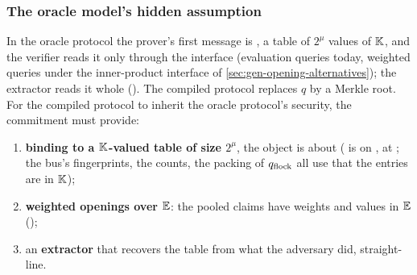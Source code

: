 \subsubsection{The oracle model's hidden assumption}\label{sec:gen-opening-hidden}

In the oracle protocol the prover's first message is , a table of $2^μ$ values
of $\mathbb{K}$, and the verifier reads it only through the interface (evaluation queries today, weighted
queries under the inner-product interface of \cref{sec:gen-opening-alternatives}); the extractor
reads it whole (). The compiled protocol replaces $q$ by a Merkle root. For
the compiled protocol to inherit the oracle protocol's security, the commitment must provide:
\begin{enumerate}
\item \textbf{binding to a $\mathbb{K}$-valued table of size $2^μ$}, the object  is about
  ( is on ,  at ; the bus's
  fingerprints, the counts, the packing of $q_{\mathrm{flock}}$ all use that the entries are in $\mathbb{K}$);
\item \textbf{weighted openings over $\mathbb{E}$}: the pooled claims have weights and values in $\mathbb{E}$
  ();
\item an \textbf{extractor} that recovers the table from what the adversary did, straight-line.
\end{enumerate}

